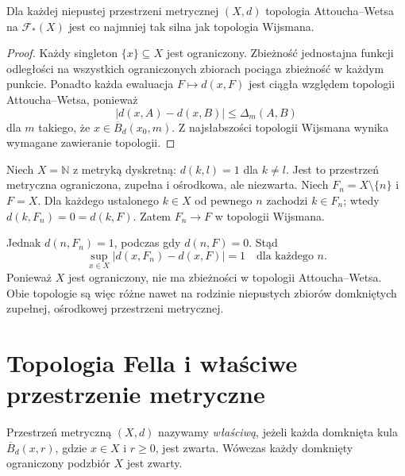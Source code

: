 \begin{stwierdzenie}
\label{prop:topog22-aw-wijsman}
Dla każdej niepustej przestrzeni metrycznej \((X,d)\)
topologia Attoucha--Wetsa na \(\mathcal F_*(X)\)
jest co najmniej tak silna jak topologia Wijsmana.
\end{stwierdzenie}
\begin{proof}
Każdy singleton \(\{x\}\subseteq X\) jest ograniczony.
Zbieżność jednostajna funkcji odległości
na wszystkich ograniczonych zbiorach
pociąga zbieżność w każdym punkcie.
Ponadto każda ewaluacja
\(F\mapsto d(x,F)\) jest ciągła względem
topologii Attoucha--Wetsa, ponieważ
\[
 |d(x,A)-d(x,B)|\le\Delta_m(A,B)
\]
dla \(m\) takiego, że \(x\in\overline B_d(x_0,m)\).
Z najsłabszości topologii Wijsmana
wynika wymagane zawieranie topologii.
\end{proof}

\begin{przyklad}
\label{ex:topog22-strict-aw}
Niech \(X=\mathbb N\) z metryką dyskretną:
\(d(k,l)=1\) dla \(k\neq l\).
Jest to przestrzeń metryczna ograniczona,
zupełna i ośrodkowa, ale niezwarta.
Niech \(F_n=X\setminus\{n\}\) i \(F=X\).
Dla każdego ustalonego \(k\in X\)
od pewnego \(n\) zachodzi \(k\in F_n\);
wtedy \(d(k,F_n)=0=d(k,F)\).
Zatem \(F_n\to F\) w topologii Wijsmana.

Jednak \(d(n,F_n)=1\), podczas gdy
\(d(n,F)=0\). Stąd
\[
 \sup_{x\in X}|d(x,F_n)-d(x,F)|=1
 \quad\text{dla każdego }n.
\]
Ponieważ \(X\) jest ograniczony,
nie ma zbieżności w topologii Attoucha--Wetsa.
Obie topologie są więc różne nawet na rodzinie
niepustych zbiorów domkniętych zupełnej,
ośrodkowej przestrzeni metrycznej.
\end{przyklad}

\section{Topologia Fella i właściwe przestrzenie metryczne}
\label{sec:topog22-proper}

\begin{definicja}
\label{def:topog22-proper}
Przestrzeń metryczną \((X,d)\) nazywamy
\emph{właściwą}, jeżeli każda domknięta
kula \(\overline B_d(x,r)\), gdzie
\(x\in X\) i \(r\ge0\), jest zwarta.
Wówczas każdy domknięty ograniczony
podzbiór \(X\) jest zwarty.
\end{definicja}

